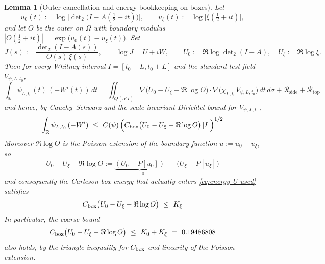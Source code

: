 \documentclass[11pt]{article}
\providecommand{\CboxZeta}{K_0 + K_\xi}%
\renewcommand{\CboxZeta}{0.19486808}
\newtheorem{lemma}[theorem]{Lemma}
\theoremstyle{definition}
\theoremstyle{remark}
\theoremstyle{definition}
\newcommand{\R}{\mathbb{R}}
\newcommand{\Poisson}{P}
\begin{document}
\begin{lemma}[Outer cancellation and energy bookkeeping on boxes]\label{lem:outer-energy-bookkeeping}
Let
\[
u_0(t):=\log\Big|\det\nolimits_2\!\big(I-A(\tfrac12+it)\big)\Big|,\qquad
u_\xi(t):=\log\big|\xi(\tfrac12+it)\big|,
\]
and let $O$ be the outer on $\Omega$ with boundary modulus
\(
|O(\tfrac12+it)|=\exp\!\big(u_0(t)-u_\xi(t)\big).
\)
Set
\[
J(s):=\frac{\det\nolimits_2(I-A(s))}{O(s)\,\xi(s)},\qquad
\log J=U+iW,\qquad U_0:=\Re\log\det\nolimits_2(I-A),\quad U_\xi:=\Re\log\xi.
\]
Then for every Whitney interval $I=[t_0-L,t_0+L]$ and the standard test field $V_{\psi,L,t_0}$,
\begin{equation}\label{eq:CRG-outer-cancel}
\int_{\R}\psi_{L,t_0}(t)\,(-W'(t))\,dt
=\iint_{Q(\alpha' I)} \nabla\!\big(U_0-U_\xi-\Re\log O\big)\cdot\nabla\!\big(\chi_{L,t_0}V_{\psi,L,t_0}\big)\,dt\,d\sigma
+\mathcal R_{\mathrm{side}}+\mathcal R_{\mathrm{top}}
\end{equation}
and hence, by Cauchy--Schwarz and the scale‑invariant Dirichlet bound for $V_{\psi,L,t_0}$,
\begin{equation}\label{eq:energy-U-used}
\int_{\R}\psi_{L,t_0}\,(-W')\ \le\ C(\psi)\,\Big(C_{\rm box}\big(U_0-U_\xi-\Re\log O\big)\,|I|\Big)^{1/2}
\end{equation}
Moreover $\Re\log O$ is the Poisson extension of the boundary function $u:=u_0-u_\xi$, so
\begin{equation}\label{eq:Poisson-splitting}
U_0-U_\xi-\Re\log O
:=\underbrace{(U_0-\Poisson[u_0])}_{\equiv 0}\ -\ \big(U_\xi-\Poisson[u_\xi]\big)
\end{equation}
and consequently the Carleson box energy that actually enters \eqref{eq:energy-U-used} satisfies
\begin{equation}\label{eq:sharp-Kxi}
C_{\rm box}\big(U_0-U_\xi-\Re\log O\big)\ \le\ K_\xi
\end{equation}
In particular, the coarse bound
\begin{equation}\label{eq:coarse-K0Kxi}
C_{\rm box}\big(U_0-U_\xi-\Re\log O\big)\ \le\ K_0+K_\xi\ =\ \CboxZeta
\end{equation}
also holds, by the triangle inequality for $C_{\rm box}$ and linearity of the Poisson extension.
\end{lemma}
\end{document}
